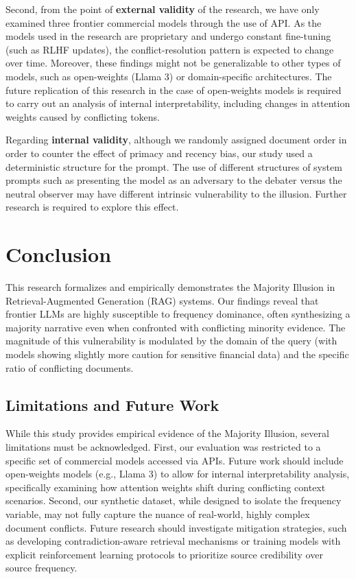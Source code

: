 \documentclass{article}
\begin{document}
Second, from the point of \textbf{external validity} of the research, we have only examined three frontier commercial models through the use of API. As the models used in the research are proprietary and undergo constant fine-tuning (such as RLHF updates), the conflict-resolution pattern is expected to change over time. Moreover, these findings might not be generalizable to other types of models, such as open-weights (Llama 3) or domain-specific architectures. The future replication of this research in the case of open-weights models is required to carry out an analysis of internal interpretability, including changes in attention weights caused by conflicting tokens.

Regarding \textbf{internal validity}, although we randomly assigned document order in order to counter the effect of primacy and recency bias, our study used a deterministic structure for the prompt. The use of different structures of system prompts such as presenting the model as an adversary to the debater versus the neutral observer may have different intrinsic vulnerability to the illusion. Further research is required to explore this effect.

\section{Conclusion}
This research formalizes and empirically demonstrates the Majority Illusion in Retrieval-Augmented Generation (RAG) systems. Our findings reveal that frontier LLMs are highly susceptible to frequency dominance, often synthesizing a majority narrative even when confronted with conflicting minority evidence. The magnitude of this vulnerability is modulated by the domain of the query (with models showing slightly more caution for sensitive financial data) and the specific ratio of conflicting documents. 

\subsection{Limitations and Future Work}
While this study provides empirical evidence of the Majority Illusion, several limitations must be acknowledged. First, our evaluation was restricted to a specific set of commercial models accessed via APIs. Future work should include open-weights models (e.g., Llama 3) to allow for internal interpretability analysis, specifically examining how attention weights shift during conflicting context scenarios. Second, our synthetic dataset, while designed to isolate the frequency variable, may not fully capture the nuance of real-world, highly complex document conflicts. Future research should investigate mitigation strategies, such as developing contradiction-aware retrieval mechanisms or training models with explicit reinforcement learning protocols to prioritize source credibility over source frequency.
\end{document}
